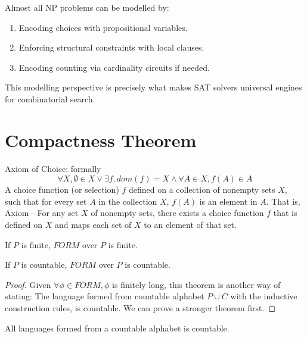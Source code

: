 \documentclass{article}
\newtheorem{theorem}{Theorem}[section]
\newtheorem{definition}[theorem]{Definition}
\let\olddefinition\definition
\let\endolddefinition\enddefinition
\renewenvironment{definition}
  {\begin{tcolorbox}[
      colback=red!10,
      colframe=red!50!black,
      boxrule=0.6pt,
      arc=2pt,
      left=6pt,right=6pt,top=4pt,bottom=4pt,
      breakable
    ]\olddefinition}
  {\endolddefinition\end{tcolorbox}}
\let\oldtheorem\theorem
\let\endoldtheorem\endtheorem
\renewenvironment{theorem}
  {\begin{tcolorbox}[
      colback=yellow!6,
      colframe=yellow!60!black,
      boxrule=0.6pt,
      arc=2pt,
      left=6pt,right=6pt,top=4pt,bottom=4pt,
      parbox=false
    ]\oldtheorem}
  {\endoldtheorem\end{tcolorbox}}
\begin{document}
Almost all NP problems can be modelled by:

\begin{enumerate}
    \item Encoding choices with propositional variables.
    \item Enforcing structural constraints with local clauses.
    \item Encoding counting via cardinality circuits if needed.
\end{enumerate}

This modelling perspective is precisely what makes SAT solvers
universal engines for combinatorial search.

\section{Compactness Theorem}
\begin{definition}
    Axiom of Choice: formally
    \[\forall X, \emptyset \in X \lor \exists f, dom(f)= X \land \forall A \in X, f(A) \in A\]
    A choice function (or selection) $f$ defined on a collection of nonempty sets $X$, such that for every set $A$ in the collection $X$,
    $f(A)$ is an element in $A$. That is, Axiom—For any set $X$ of nonempty sets, 
    there exists a choice function $f$ that is defined on $X$ and maps each set of $X$ to an element of that set. 
\end{definition}
\begin{theorem}
    If $P$ is finite, $FORM$ over $P$ is finite.
\end{theorem}
\begin{theorem}
    If $P$ is countable, $FORM$ over $P$ is countable.
\end{theorem}
\begin{proof}
    Given $\forall \phi \in FORM, \phi$ is finitely long, this theorem is another way of stating: The language formed from countable 
    alphabet $P\cup C$ with the inductive construction rules, is countable. We can prove a stronger theorem first. 
\end{proof}
\begin{theorem}
    All languages formed from a countable alphabet is countable. 
\end{theorem}
\end{document}
